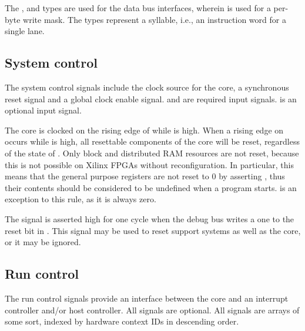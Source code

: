 \documentclass[main.tex]{subfiles}
\begin{document}
The ,  and  types are used for the data bus interfaces, wherein  is used for a per-byte write mask. The  types represent a syllable, i.e., an instruction word for a single lane.

\subsection{System control}

The system control signals include the clock source for the core, a synchronous reset signal and a global clock enable signal.  and  are required  input signals.  is an optional  input signal.

The core is clocked on the rising edge of  while  is high. When a rising edge on  occurs while  is high, all resettable components of the core will be reset, regardless of the state of . Only block and distributed RAM resources are not reset, because this is not possible on Xilinx FPGAs without reconfiguration. In particular, this means that the general purpose registers are not reset to 0 by asserting , thus their contents should be considered to be undefined when a program starts.  is an exception to this rule, as it is always zero.

The  signal is asserted high for one cycle when the debug bus writes a one to the reset bit in . This signal may be used to reset support systems as well as the core, or it may be ignored.

\subsection{Run control}

The run control signals provide an interface between the core and an interrupt controller and/or host controller. All signals are optional. All signals are arrays of some sort, indexed by hardware context IDs in descending order.
\end{document}
